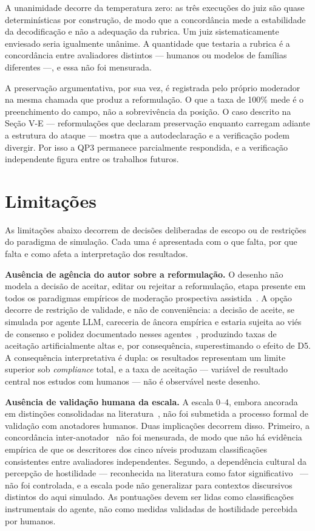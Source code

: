 \documentclass[conference]{IEEEtran} \IEEEoverridecommandlockouts %
\begin{document}
A unanimidade decorre da temperatura zero: as três execuções do juiz são quase
determinísticas por construção, de modo que a concordância mede a estabilidade
da decodificação e não a adequação da rubrica. Um juiz sistematicamente
enviesado seria igualmente unânime. A quantidade que testaria a rubrica é a
concordância entre avaliadores distintos — humanos ou modelos de famílias
diferentes —, e essa não foi mensurada.

A preservação argumentativa, por sua vez, é registrada pelo próprio moderador
na mesma chamada que produz a reformulação. O que a taxa de 100\% mede é o
preenchimento do campo, não a sobrevivência da posição. O caso descrito na
Seção V-E — reformulações que declaram preservação enquanto carregam adiante a
estrutura do ataque — mostra que a autodeclaração e a verificação podem
divergir. Por isso a QP3 permanece parcialmente respondida, e a verificação
independente figura entre os trabalhos futuros.

\section{Limitações}

As limitações abaixo decorrem de decisões deliberadas de escopo ou de restrições
do paradigma de simulação. Cada uma é apresentada com o que falta, por que
falta e como afeta a interpretação dos resultados.

\textbf{Ausência de agência do autor sobre a reformulação.} O desenho não
modela a decisão de aceitar, editar ou rejeitar a reformulação, etapa presente
em todos os paradigmas empíricos de moderação prospectiva
assistida~\cite{argyle2023leveraging,katsaros2022reconsidering,tessler2024ai}.
A opção decorre de restrição de validade, e não de conveniência: a decisão de
aceite, se simulada por agente LLM, careceria de âncora empírica e estaria
sujeita ao viés de consenso e polidez documentado nesses
agentes~\cite{chuang2023simulating}, produzindo taxas de aceitação
artificialmente altas e, por consequência, superestimando o efeito de D5. A
consequência interpretativa é dupla: os resultados representam um limite
superior sob \textit{compliance} total, e a taxa de aceitação — variável de
resultado central nos estudos com humanos — não é observável neste desenho.

\textbf{Ausência de validação humana da escala.} A escala 0--4, embora ancorada
em distinções consolidadas na
literatura~\cite{papacharissi2004democracy,coe2014online,rossini2022beyond,bentivegna2022searching},
não foi submetida a processo formal de validação com anotadores humanos. Duas
implicações decorrem disso. Primeiro, a concordância
inter-anotador~\cite{krippendorff2011computing} não foi mensurada, de modo que
não há evidência empírica de que os descritores dos cinco níveis produzam
classificações consistentes entre avaliadores independentes. Segundo, a
dependência cultural da percepção de hostilidade — reconhecida na literatura
como fator significativo~\cite{papacharissi2004democracy,rossini2022beyond} —
não foi controlada, e a escala pode não generalizar para contextos discursivos
distintos do aqui simulado. As pontuações devem ser lidas como classificações
instrumentais do agente, não como medidas validadas de hostilidade percebida
por humanos.
\end{document}
